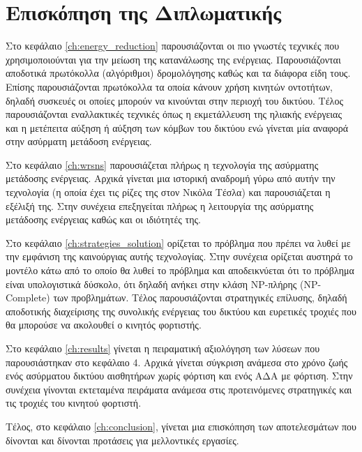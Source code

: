 \section{Επισκόπηση της Διπλωματικής}
Στο κεφάλαιο \ref{ch:energy_reduction} παρουσιάζονται οι πιο γνωστές τεχνικές που χρησιμοποιούνται για την μείωση της κατανάλωσης της ενέργειας. Παρουσιάζονται
αποδοτικά πρωτόκολλα (αλγόριθμοι) δρομολόγησης καθώς και τα διάφορα είδη τους. Επίσης παρουσιάζονται πρωτόκολλα τα οποία κάνουν χρήση κινητών οντοτήτων, δηλαδή
συσκευές οι οποίες μπορούν να κινούνται στην περιοχή του δικτύου. Τέλος παρουσιάζονται εναλλακτικές τεχνικές όπως η εκμετάλλευση της ηλιακής ενέργειας και η μετέπειτα
αύξηση ή αύξηση των κόμβων του δικτύου ενώ γίνεται μία αναφορά στην ασύρματη μετάδοση ενέργειας.

Στο κεφάλαιο \ref{ch:wrsns} παρουσιάζεται πλήρως η τεχνολογία της ασύρματης μετάδοσης ενέργειας. Αρχικά γίνεται μια ιστορική αναδρομή γύρω από αυτήν την τεχνολογία (η
οποία έχει τις ρίζες της στον Νικόλα Τέσλα) και παρουσιάζεται η εξέλιξή της. Στην συνέχεια επεξηγείται πλήρως η λειτουργία της ασύρματης μετάδοσης ενέργειας καθώς και
οι ιδιότητές της.

Στο κεφάλαιο \ref{ch:strategies_solution} ορίζεται το πρόβλημα που πρέπει να λυθεί με την εμφάνιση της καινούργιας αυτής τεχνολογίας. Στην συνέχεια ορίζεται αυστηρά
το μοντέλο κάτω από το οποίο θα λυθεί το πρόβλημα και αποδεικνύεται ότι το πρόβλημα είναι υπολογιστικά δύσκολο, ότι δηλαδή ανήκει στην κλάση NP-πλήρης (NP-Complete)
των προβλημάτων. Τέλος παρουσιάζονται στρατηγικές επίλυσης, δηλαδή αποδοτικής διαχείρισης της συνολικής ενέργειας του δικτύου και ευρετικές τροχιές που θα μπορούσε να
ακολουθεί ο κινητός φορτιστής.

Στο κεφάλαιο \ref{ch:results} γίνεται η πειραματική αξιολόγηση των λύσεων που παρουσιάστηκαν στο κεφάλαιο 4. Αρχικά γίνεται σύγκριση ανάμεσα στο χρόνο ζωής ενός
ασύρματου δικτύου αισθητήρων χωρίς φόρτιση και ενός ΑΔΑ με φόρτιση. Στην συνέχεια γίνονται εκτεταμένα πειράματα ανάμεσα στις προτεινόμενες στρατηγικές και τις τροχιές
του κινητού φορτιστή.

Τέλος, στο κεφάλαιο \ref{ch:conclusion}, γίνεται μια επισκόπηση των αποτελεσμάτων που δίνονται και δίνονται προτάσεις για μελλοντικές εργασίες.


\label{ch:wsns}